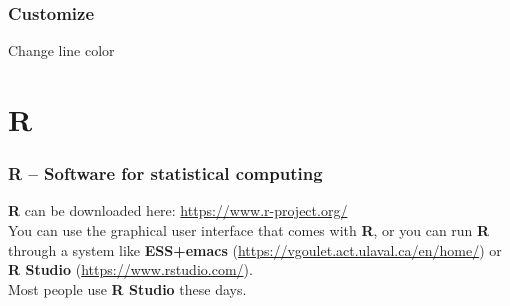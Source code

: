 \documentclass[color=usenames,dvipsnames]{beamer}\usepackage[]{graphicx}\usepackage[]{color}
\begin{document}
\begin{frame}
  \frametitle{Customize}
    \begin{center}
      Change line color
    \end{center}
\end{frame}



\section{R}


\begin{frame}[fragile]
  \frametitle{R -- Software for statistical computing}
  {\bf R} can be downloaded here: \url{https://www.r-project.org/} \\
  \pause
  \vfill
  You can use the graphical user interface that comes with {\bf R}, or you
  can run {\bf R} through a system like {\bf ESS+emacs}
  (\url{https://vgoulet.act.ulaval.ca/en/home/}) or {\bf R Studio}
  (\url{https://www.rstudio.com/}). \\
  \pause
  \vfill
  Most people use {\bf R Studio} these days.
\end{frame}
\end{document}
